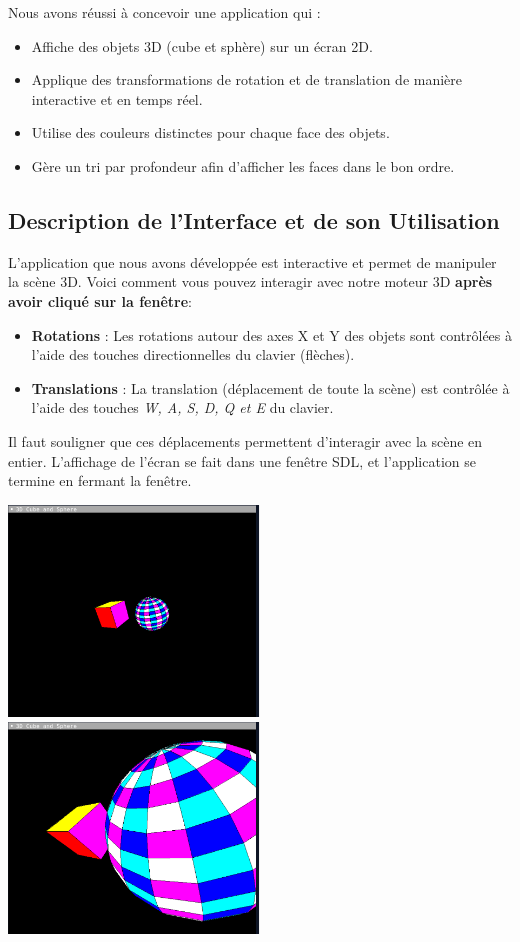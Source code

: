 \documentclass[12pt]{article}
\begin{document}
\noindent Nous avons réussi à concevoir une application qui :

\begin{itemize}
    \item Affiche des objets 3D (cube et sphère) sur un écran 2D.
    \item Applique des transformations de rotation et de translation de manière interactive et en temps réel.
    \item Utilise des couleurs distinctes pour chaque face des objets.
    \item Gère un tri par profondeur afin d'afficher les faces dans le bon ordre.
\end{itemize}

\subsection{Description de l'Interface et de son Utilisation}
\label{subsec:description_utilisation}

\noindent L'application que nous avons développée est interactive et permet de manipuler la scène 3D. Voici comment vous pouvez interagir avec notre moteur 3D \textbf{après avoir cliqué sur la fenêtre}:

\begin{itemize}
    \item \textbf{Rotations} : Les rotations autour des axes X et Y des objets sont contrôlées à l'aide des touches directionnelles du clavier (flèches).
    \item \textbf{Translations} : La translation (déplacement de toute la scène) est contrôlée à l'aide des touches \textit{W, A, S, D, Q et E} du clavier.
\end{itemize}
Il faut souligner que ces déplacements permettent d'interagir avec la scène en entier. L'affichage de l'écran se fait dans une fenêtre SDL, et l'application se termine en fermant la fenêtre.

\begin{center}
\includegraphics[width=0.5\textwidth]{4.png}
\includegraphics[width=0.5\textwidth]{5.png}
\end{center}
\end{document}
